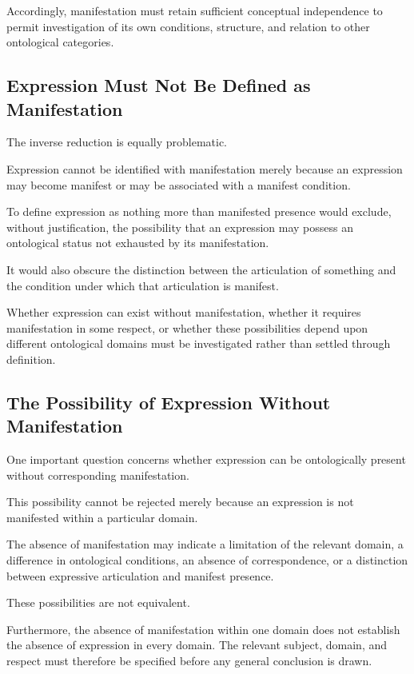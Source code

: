 Accordingly, manifestation must retain sufficient conceptual
independence to permit investigation of its own conditions,
structure, and relation to other ontological categories.

\subsection{Expression Must Not Be Defined as Manifestation}

The inverse reduction is equally problematic.

Expression cannot be identified with manifestation merely
because an expression may become manifest or may be
associated with a manifest condition.

To define expression as nothing more than manifested presence
would exclude, without justification, the possibility that
an expression may possess an ontological status not exhausted
by its manifestation.

It would also obscure the distinction between the articulation
of something and the condition under which that articulation
is manifest.

Whether expression can exist without manifestation, whether
it requires manifestation in some respect, or whether these
possibilities depend upon different ontological domains
must be investigated rather than settled through definition.

\subsection{The Possibility of Expression Without Manifestation}

One important question concerns whether expression can
be ontologically present without corresponding manifestation.

This possibility cannot be rejected merely because an expression
is not manifested within a particular domain.

The absence of manifestation may indicate a limitation
of the relevant domain, a difference in ontological conditions,
an absence of correspondence, or a distinction between
expressive articulation and manifest presence.

These possibilities are not equivalent.

Furthermore, the absence of manifestation within one domain
does not establish the absence of expression in every domain.
The relevant subject, domain, and respect must therefore
be specified before any general conclusion is drawn.

